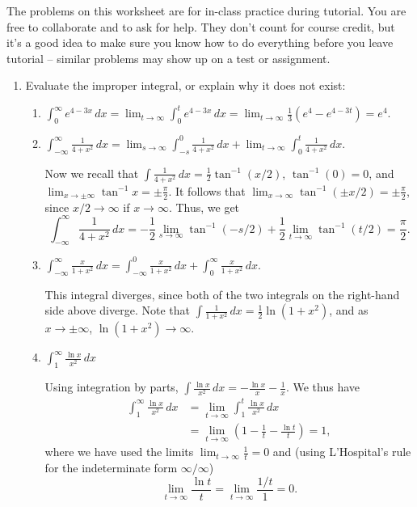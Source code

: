 \documentclass[12pt]{article}
\newcommand{\di}{\displaystyle}
\begin{document}
\thispagestyle{fancy}
The problems on this worksheet are for in-class practice during tutorial. You are free to collaborate and to ask for help. They don't count for course credit, but it's a good idea to make sure you know how to do everything before you leave tutorial -- similar problems may show up on a test or assignment.

\begin{enumerate}
 \item Evaluate the improper integral, or explain why it does not exist:
\begin{enumerate}
 \item $\di \int_0^\infty e^{4-3x}\,dx = \lim_{t\to \infty}\int_0^t e^{4-3x}\,dx = \lim_{t\to\infty}\frac{1}{3}(e^4-e^{4-3t})=e^4.$
 \item $\di \int_{-\infty}^\infty \frac{1}{4+x^2}\,dx = \lim_{s\to\infty}\int_{-s}^0\frac{1}{4+x^2}\,dx+\lim_{t\to\infty}\int_0^t\frac{1}{4+x^2}\,dx$.

Now we recall that $\di \int \frac{1}{4+x^2}\,dx = \frac{1}{2}\tan^{-1}(x/2)$, $\tan^{-1}(0)=0$, and $\lim_{x\to\pm\infty}\tan^{-1}x = \pm \frac{\pi}{2}$. It follows that $\lim_{x\to\infty}\tan^{-1}(\pm x/2) = \pm \frac{\pi}{2}$, since $x/2\to \infty$ if $x\to \infty$. Thus, we get
\[
 \int_{-\infty}^\infty \frac{1}{4+x^2}\,dx = -\frac{1}{2}\lim_{s\to \infty}\tan^{-1}(-s/2)+\frac{1}{2}\lim_{t\to\infty}\tan^{-1}(t/2) = \frac{\pi}{2}.
\]

 \item $\di \int_{-\infty}^\infty \frac{x}{1+x^2}\,dx = \int_{-\infty}^0 \frac{x}{1+x^2}\,dx + \int_0^\infty\frac{x}{1+x^2}\,dx$.

This integral diverges, since both of the two integrals on the right-hand side above diverge. Note that $\di \int\frac{1}{1+x^2}\,dx = \frac{1}{2}\ln(1+x^2)$, and as $x\to \pm\infty$, $\ln(1+x^2)\to\infty$.


 \item $\di \int_1^\infty\frac{\ln x}{x^2}\,dx$

\bigskip

Using integration by parts, $\di\int\frac{\ln x}{x^2}\,dx = -\frac{\ln x}{x}-\frac{1}{x}$. We thus have
\begin{align*}
 \int_1^\infty\frac{\ln x}{x^2}\,dx & = \lim_{t\to\infty}\int_1^t \frac{\ln x}{x^2}\,dx\\
& = \lim_{t\to\infty}\left(1-\frac{1}{t}-\frac{\ln t}{t}\right) = 1,
\end{align*}
where we have used the limits $\di\lim_{t\to\infty}\frac{1}{t} = 0$ and (using L'Hospital's rule for the indeterminate form $\infty/\infty$)
\[
 \lim_{t\to\infty}\frac{\ln t}{t} = \lim_{t\to\infty}\frac{1/t}{1} = 0.
\]




\end{enumerate}
\end{enumerate}
\end{document}
